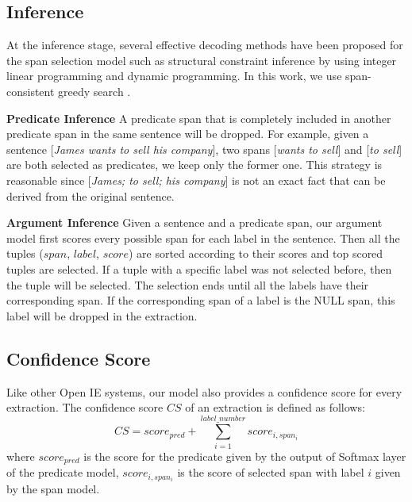 \documentclass[letterpaper]{article} %
\begin{document}
\subsection{Inference}
 At the inference stage, several effective decoding methods have been proposed for the span selection model such as structural constraint inference by using integer linear programming  and dynamic programming. In this work, we use  span-consistent greedy search \cite{Ouchi2018ASS}. 

\textbf{Predicate Inference} A predicate span that is completely included in another predicate span in the same sentence will be dropped. For example, given a sentence [\emph{James wants to sell his company}], two spans [\emph{wants to sell}] and [\emph{to sell}] are both selected as predicates, we keep only the former one. This strategy is reasonable since [\emph{James; to sell; his company}] is not an exact fact that can be derived from the original sentence.

\textbf{Argument Inference} Given a sentence and a predicate span, our argument model first scores every possible span for each label in the sentence. Then all the tuples ($span$, $label$, $score$) are sorted according to their scores and top scored tuples are selected. If a tuple with a specific label was not selected before, then the tuple will be selected. The selection ends until all the labels have their corresponding span. If the corresponding span of a label is the NULL span, this label will be dropped in the extraction.

 

\subsection{Confidence Score}
Like other Open IE systems, our model also provides a confidence score for every extraction. The confidence score $CS$ of an extraction is defined as follows:
\begin{equation}
        CS = score_{pred} + \sum_{i=1}^{label\_number}score_{i,span_i}
\end{equation}
where $score_{pred}$ is the score for the predicate given by the output of Softmax layer of the predicate model, $score_{i,span_i}$ is the score of selected span with label $i$ given by the span model.
\end{document}
